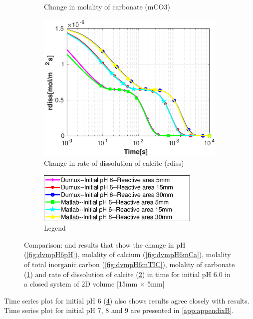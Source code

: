 \begin{figure}[!h]
\begin{subfigure}{.5\linewidth}
        \caption{Change in molality of carbonate (mCO3)}
        \label{fig:dvmpH6mCO3}
    \end{subfigure}%
    \hfill
    \begin{subfigure}{.5\linewidth}
            \centering
        \includegraphics[width=\textwidth]{PICTURES/dvm_pH6_rdiss.eps}
        \caption{Change in rate of dissolution of calcite (rdiss)}
        \label{fig:dvmpH6rdiss}
    \end{subfigure}%
  \hfill
  \hfill
    \begin{subfigure}{.5\linewidth}
            \centering
        \includegraphics[width=0.85\textwidth]{PICTURES/dvm_pH6_legend.eps}
        \caption{Legend}
        \label{fig:dvmpH6legend}
    \end{subfigure}%
    \caption{Comparison: \DuMuX and \MATLAB results that show the change in pH (\cref{fig:dvmpH6pH}), 
    molality of calcium (\cref{fig:dvmpH6mCa}), molality of total inorganic carbon (\cref{fig:dvmpH6mTIC}), 
    molality of carbonate (\cref{fig:dvmpH6mCO3}) and rate of dissolution of calcite (\cref{fig:dvmpH6rdiss}) 
    in time for initial pH 6.0 in a closed system of 2D volume [15mm $\times$ 5mm]} 
    \label{fig:comparisionDumuxMatlab_pH6.0}
\end{figure}

Time series plot for initial pH 6 (\cref{fig:comparisionDumuxMatlab_pH6.0}) also shows \MATLAB results agree closely with \DuMuX results. 
Time series plot for initial pH 7, 8 and 9 are presented in \cref{app:appendixB}.


\endinput